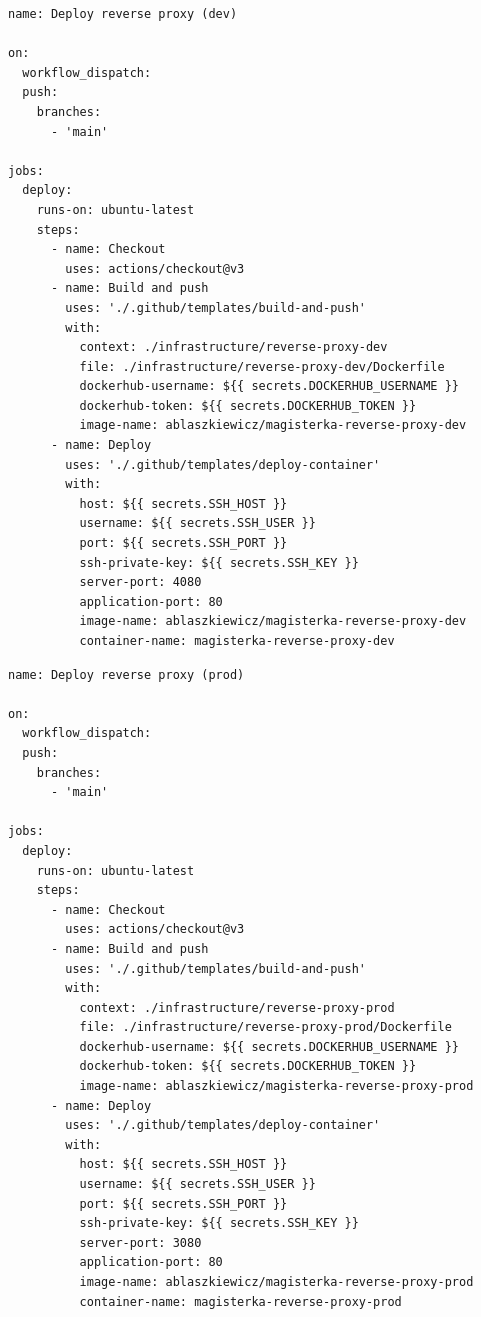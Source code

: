 \documentclass{article}
\begin{document}
\begin{lstlisting}[caption=Plik \texttt{.github/workflows/dev-deploy-reverse-proxy.yml}]
name: Deploy reverse proxy (dev)

on:
  workflow_dispatch:
  push:
    branches:
      - 'main'

jobs:
  deploy:
    runs-on: ubuntu-latest
    steps:
      - name: Checkout
        uses: actions/checkout@v3
      - name: Build and push
        uses: './.github/templates/build-and-push'
        with:
          context: ./infrastructure/reverse-proxy-dev
          file: ./infrastructure/reverse-proxy-dev/Dockerfile
          dockerhub-username: ${{ secrets.DOCKERHUB_USERNAME }}
          dockerhub-token: ${{ secrets.DOCKERHUB_TOKEN }}
          image-name: ablaszkiewicz/magisterka-reverse-proxy-dev
      - name: Deploy
        uses: './.github/templates/deploy-container'
        with:
          host: ${{ secrets.SSH_HOST }}
          username: ${{ secrets.SSH_USER }}
          port: ${{ secrets.SSH_PORT }}
          ssh-private-key: ${{ secrets.SSH_KEY }}
          server-port: 4080
          application-port: 80
          image-name: ablaszkiewicz/magisterka-reverse-proxy-dev
          container-name: magisterka-reverse-proxy-dev

\end{lstlisting}

\begin{lstlisting}[caption=Plik \texttt{.github/workflows/prod-deploy-reverse-proxy.yml}]
name: Deploy reverse proxy (prod)

on:
  workflow_dispatch:
  push:
    branches:
      - 'main'

jobs:
  deploy:
    runs-on: ubuntu-latest
    steps:
      - name: Checkout
        uses: actions/checkout@v3
      - name: Build and push
        uses: './.github/templates/build-and-push'
        with:
          context: ./infrastructure/reverse-proxy-prod
          file: ./infrastructure/reverse-proxy-prod/Dockerfile
          dockerhub-username: ${{ secrets.DOCKERHUB_USERNAME }}
          dockerhub-token: ${{ secrets.DOCKERHUB_TOKEN }}
          image-name: ablaszkiewicz/magisterka-reverse-proxy-prod
      - name: Deploy
        uses: './.github/templates/deploy-container'
        with:
          host: ${{ secrets.SSH_HOST }}
          username: ${{ secrets.SSH_USER }}
          port: ${{ secrets.SSH_PORT }}
          ssh-private-key: ${{ secrets.SSH_KEY }}
          server-port: 3080
          application-port: 80
          image-name: ablaszkiewicz/magisterka-reverse-proxy-prod
          container-name: magisterka-reverse-proxy-prod

\end{lstlisting}
\end{document}
